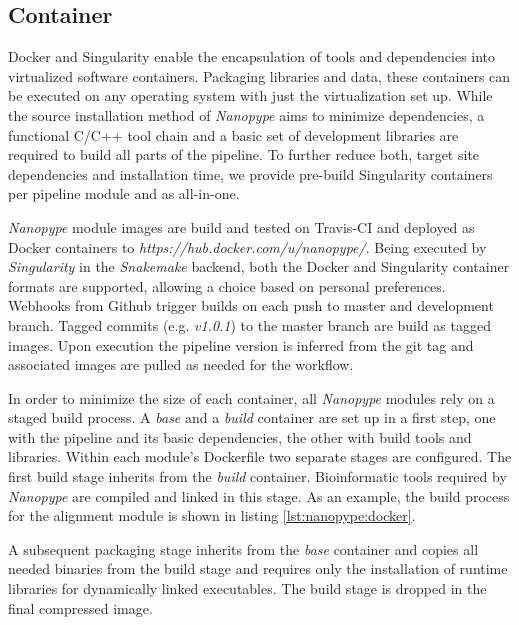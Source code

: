 \subsection{Container}

Docker and Singularity enable the encapsulation of tools and dependencies into virtualized software containers. Packaging libraries and data, these containers can be executed on any operating system with just the virtualization set up. While the source installation method of \textit{Nanopype} aims to minimize dependencies, a functional C/C++ tool chain and a basic set of development libraries are required to build all parts of the pipeline. To further reduce both, target site dependencies and installation time, we provide pre-build Singularity containers per pipeline module and as all-in-one.

\textit{Nanopype} module images are build and tested on Travis-CI and deployed as Docker containers to \textit{https://hub.docker.com/u/nanopype/}. Being executed by \textit{Singularity} in the \textit{Snakemake} backend, both the Docker and Singularity container formats are supported, allowing a choice based on personal preferences.
Webhooks from Github trigger builds on each push to master and development branch. Tagged commits (e.g. \textit{v1.0.1}) to the master branch are build as tagged images. Upon execution the pipeline version is inferred from the git tag and associated images are pulled as needed for the workflow.


In order to minimize the size of each container, all \textit{Nanopype} modules rely on a staged build process. A \textit{base} and a \textit{build} container are set up in a first step, one with the pipeline and its basic dependencies, the other with build tools and libraries. Within each module's Dockerfile two separate stages are configured. The first build stage inherits from the \textit{build} container. Bioinformatic tools required by \textit{Nanopype} are compiled and linked in this stage. As an example, the build process for the alignment module is shown in listing \ref{lst:nanopype:docker}.



A subsequent packaging stage inherits from the \textit{base} container and copies all needed binaries from the build stage and requires only the installation of runtime libraries for dynamically linked executables. The build stage is dropped in the final compressed image. 

